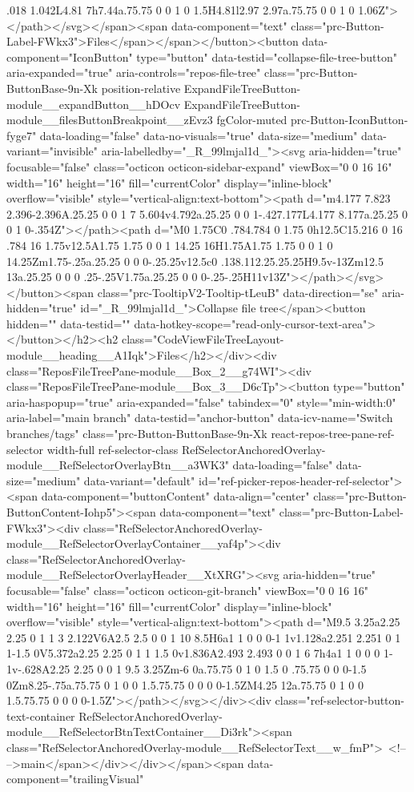 {{{{{{{.018 1.042L4.81 7h7.44a.75.75 0 0 1 0 1.5H4.81l2.97 2.97a.75.75 0 0 1 0 1.06Z"></path></svg></span><span data-component="text" class="prc-Button-Label-FWkx3">Files</span></span></button><button data-component="IconButton" type="button" data-testid="collapse-file-tree-button" aria-expanded="true" aria-controls="repos-file-tree" class="prc-Button-ButtonBase-9n-Xk position-relative ExpandFileTreeButton-module__expandButton__hDOcv ExpandFileTreeButton-module__filesButtonBreakpoint__zEvz3 fgColor-muted prc-Button-IconButton-fyge7" data-loading="false" data-no-visuals="true" data-size="medium" data-variant="invisible" aria-labelledby="_R_99lmjal1d_"><svg aria-hidden="true" focusable="false" class="octicon octicon-sidebar-expand" viewBox="0 0 16 16" width="16" height="16" fill="currentColor" display="inline-block" overflow="visible" style="vertical-align:text-bottom"><path d="m4.177 7.823 2.396-2.396A.25.25 0 0 1 7 5.604v4.792a.25.25 0 0 1-.427.177L4.177 8.177a.25.25 0 0 1 0-.354Z"></path><path d="M0 1.75C0 .784.784 0 1.75 0h12.5C15.216 0 16 .784 16 1.75v12.5A1.75 1.75 0 0 1 14.25 16H1.75A1.75 1.75 0 0 1 0 14.25Zm1.75-.25a.25.25 0 0 0-.25.25v12.5c0 .138.112.25.25.25H9.5v-13Zm12.5 13a.25.25 0 0 0 .25-.25V1.75a.25.25 0 0 0-.25-.25H11v13Z"></path></svg></button><span class="prc-TooltipV2-Tooltip-tLeuB" data-direction="se" aria-hidden="true" id="_R_99lmjal1d_">Collapse file tree</span><button hidden="" data-testid="" data-hotkey-scope="read-only-cursor-text-area"></button></h2><h2 class="CodeViewFileTreeLayout-module__heading__A1Iqk">Files</h2></div><div class="ReposFileTreePane-module__Box_2__g74WI"><div class="ReposFileTreePane-module__Box_3__D6cTp"><button type="button" aria-haspopup="true" aria-expanded="false" tabindex="0" style="min-width:0" aria-label="main branch" data-testid="anchor-button" data-icv-name="Switch branches/tags" class="prc-Button-ButtonBase-9n-Xk react-repos-tree-pane-ref-selector width-full ref-selector-class RefSelectorAnchoredOverlay-module__RefSelectorOverlayBtn__a3WK3" data-loading="false" data-size="medium" data-variant="default" id="ref-picker-repos-header-ref-selector"><span data-component="buttonContent" data-align="center" class="prc-Button-ButtonContent-Iohp5"><span data-component="text" class="prc-Button-Label-FWkx3"><div class="RefSelectorAnchoredOverlay-module__RefSelectorOverlayContainer__yaf4p"><div class="RefSelectorAnchoredOverlay-module__RefSelectorOverlayHeader__XtXRG"><svg aria-hidden="true" focusable="false" class="octicon octicon-git-branch" viewBox="0 0 16 16" width="16" height="16" fill="currentColor" display="inline-block" overflow="visible" style="vertical-align:text-bottom"><path d="M9.5 3.25a2.25 2.25 0 1 1 3 2.122V6A2.5 2.5 0 0 1 10 8.5H6a1 1 0 0 0-1 1v1.128a2.251 2.251 0 1 1-1.5 0V5.372a2.25 2.25 0 1 1 1.5 0v1.836A2.493 2.493 0 0 1 6 7h4a1 1 0 0 0 1-1v-.628A2.25 2.25 0 0 1 9.5 3.25Zm-6 0a.75.75 0 1 0 1.5 0 .75.75 0 0 0-1.5 0Zm8.25-.75a.75.75 0 1 0 0 1.5.75.75 0 0 0 0-1.5ZM4.25 12a.75.75 0 1 0 0 1.5.75.75 0 0 0 0-1.5Z"></path></svg></div><div class="ref-selector-button-text-container RefSelectorAnchoredOverlay-module__RefSelectorBtnTextContainer__Di3rk"><span class="RefSelectorAnchoredOverlay-module__RefSelectorText__w_fmP"> <!-- -->main</span></div></div></span><span data-component="trailingVisual" }}}}}}}
